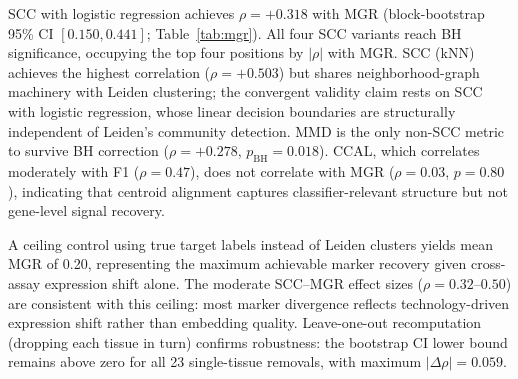 \documentclass[11pt]{article}
\begin{document}
SCC with logistic regression achieves $\rho = +0.318$ with MGR
(block-bootstrap 95\% CI $[0.150, 0.441]$;
Table~\ref{tab:mgr}). All four SCC variants reach BH significance,
occupying the top four positions by $|\rho|$ with MGR. SCC (kNN)
achieves the highest correlation ($\rho = +0.503$) but shares
neighborhood-graph machinery with Leiden clustering; the convergent
validity claim rests on SCC with logistic regression, whose linear
decision boundaries are structurally independent of Leiden's community
detection. MMD is the only non-SCC metric to survive BH correction
($\rho = +0.278$, $p_{\text{BH}} = 0.018$). CCAL, which correlates
moderately with F1 ($\rho = 0.47$), does not correlate with MGR
($\rho = 0.03$, $p = 0.80$), indicating that centroid alignment
captures classifier-relevant structure but not gene-level signal
recovery.

A ceiling control using true target labels instead of Leiden clusters
yields mean MGR of 0.20, representing the maximum achievable marker
recovery given cross-assay expression shift alone. The moderate
SCC--MGR effect sizes ($\rho = 0.32$--$0.50$) are consistent with
this ceiling: most marker divergence reflects technology-driven
expression shift rather than embedding quality. Leave-one-out
recomputation (dropping each tissue in turn) confirms robustness: the
bootstrap CI lower bound remains above zero for all 23 single-tissue
removals, with maximum $|\Delta\rho| = 0.059$.
\end{document}
